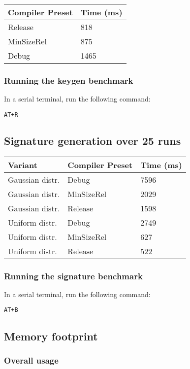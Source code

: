 \documentclass[
]{article}
\begin{document}
\begin{longtable}[]{@{}ll@{}}
\toprule
Compiler Preset & Time (ms)\tabularnewline
\midrule
\endhead
Release & 818\tabularnewline
MinSizeRel & 875\tabularnewline
Debug & 1465\tabularnewline
\bottomrule
\end{longtable}

\hypertarget{running-the-keygen-benchmark}{%
\subsubsection{Running the keygen
benchmark}\label{running-the-keygen-benchmark}}

In a serial terminal, run the following command:

\texttt{AT+R}

\hypertarget{signature-generation-over-25-runs}{%
\subsection{Signature generation over 25
runs}\label{signature-generation-over-25-runs}}

\begin{longtable}[]{@{}lll@{}}
\toprule
Variant & Compiler Preset & Time (ms)\tabularnewline
\midrule
\endhead
Gaussian distr. & Debug & 7596\tabularnewline
Gaussian distr. & MinSizeRel & 2029\tabularnewline
Gaussian distr. & Release & 1598\tabularnewline
Uniform distr. & Debug & 2749\tabularnewline
Uniform distr. & MinSizeRel & 627\tabularnewline
Uniform distr. & Release & 522\tabularnewline
\bottomrule
\end{longtable}

\hypertarget{running-the-signature-benchmark}{%
\subsubsection{Running the signature
benchmark}\label{running-the-signature-benchmark}}

In a serial terminal, run the following command:

\texttt{AT+B}

\hypertarget{memory-footprint}{%
\subsection{Memory footprint}\label{memory-footprint}}

\hypertarget{overall-usage}{%
\subsubsection{Overall usage}\label{overall-usage}}
\end{document}
